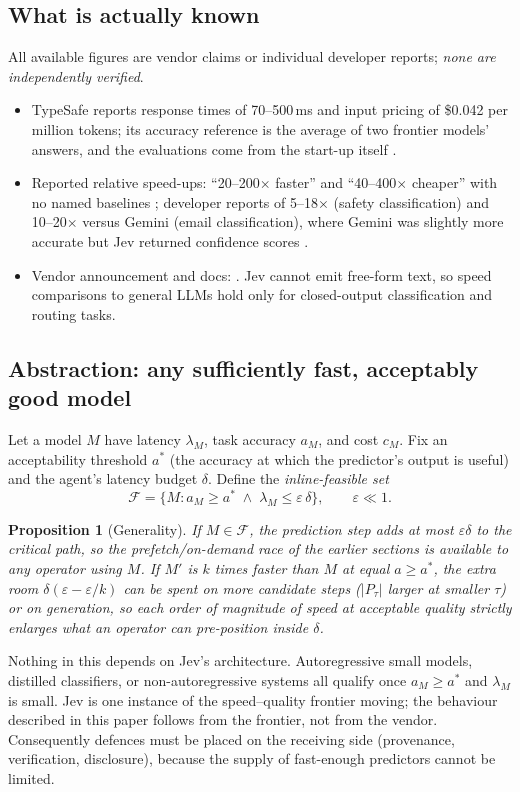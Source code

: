 \documentclass[11pt]{article}
\newtheorem{proposition}{Proposition}
\begin{document}
\subsection{What is actually known}
All available figures are vendor claims or individual developer reports; \emph{none are independently verified}.
\begin{itemize}
\item TypeSafe reports response times of 70--500\,ms and input pricing of \$0.042 per million tokens; its accuracy
      reference is the average of two frontier models' answers, and the evaluations come from the start-up itself
      \cite{heise}.
\item Reported relative speed-ups: ``20--200$\times$ faster'' and ``40--400$\times$ cheaper'' with no named baselines
      \cite{latentspace}; developer reports of 5--18$\times$ (safety classification) and 10--20$\times$ versus Gemini
      (email classification), where Gemini was slightly more accurate but Jev returned confidence scores
      \cite{techcrunch}.
\item Vendor announcement and docs: \cite{typesafe}. Jev cannot emit free-form text, so speed comparisons to general LLMs
      hold only for closed-output classification and routing tasks.
\end{itemize}

\subsection{Abstraction: any sufficiently fast, acceptably good model}
Let a model $M$ have latency $\lambda_M$, task accuracy $a_M$, and cost $c_M$. Fix an acceptability
threshold $a^\ast$ (the accuracy at which the predictor's output is useful) and the agent's latency budget
$\delta$. Define the \emph{inline-feasible set}
\[
\mathcal F=\{M : a_M\ge a^\ast \;\wedge\; \lambda_M\le \varepsilon\,\delta\},\qquad \varepsilon\ll 1 .
\]
\begin{proposition}[Generality]
If $M\in\mathcal F$, the prediction step adds at most $\varepsilon\delta$ to the critical path, so the
prefetch/on-demand race of the earlier sections is available to any operator using $M$. If $M'$ is $k$ times faster
than $M$ at equal $a\ge a^\ast$, the extra room $\delta(\varepsilon-\varepsilon/k)$ can be spent on
more candidate steps ($|P_\tau|$ larger at smaller $\tau$) or on generation, so each order of magnitude
of speed at acceptable quality strictly enlarges what an operator can pre-position inside $\delta$.
\end{proposition}
Nothing in this depends on Jev's architecture. Autoregressive small models, distilled classifiers, or
non-autoregressive systems all qualify once $a_M\ge a^\ast$ and $\lambda_M$ is small. Jev is one instance of the
speed--quality frontier moving; the behaviour described in this paper follows from the frontier, not from the
vendor. Consequently defences must be placed on the receiving side (provenance, verification, disclosure), because
the supply of fast-enough predictors cannot be limited.
\end{document}

